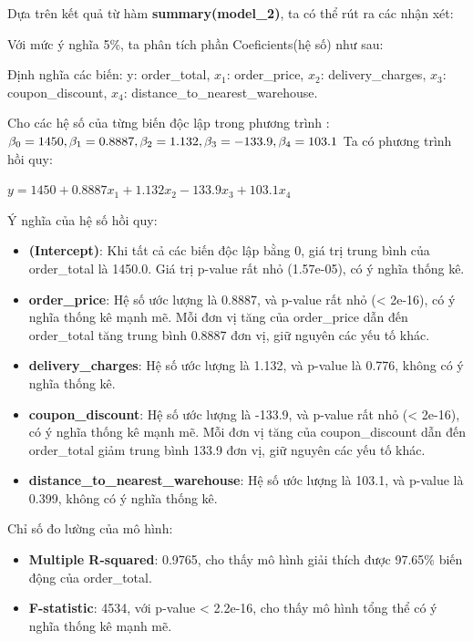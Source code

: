 Dựa trên kết quả từ hàm \textbf{summary(model\_2)}, ta có thể rút ra các nhận xét:

Với mức ý nghĩa 5\%, ta phân tích phần Coeficients(hệ số) như sau:

Định nghĩa các biến:  y: order\_total, $x_1$: order\_price, $x_2$: delivery\_charges, $x_3$: coupon\_discount, $x_4$: distance\_to\_nearest\_warehouse.

Cho các hệ số của từng biến độc lập trong phương trình : $\beta_0= 1450, \beta_1= 0.8887, \\\beta_2= 1.132, \beta_3= -133.9, \beta_4= 103.1$ Ta có phương trình hồi quy: 

 \hspace{25mm}$y= 1450 + 0.8887x_1 + 1.132x_2 - 133.9x_3 + 103.1x_4$

Ý nghĩa của hệ số hồi quy:
\begin{itemize}
\item\textbf{(Intercept)}: Khi tất cả các biến độc lập bằng 0, giá trị trung bình của order\_total là 1450.0. Giá trị p-value rất nhỏ (1.57e-05), có ý nghĩa thống kê.
\item\textbf{order\_price}: Hệ số ước lượng là 0.8887, và p-value rất nhỏ (< 2e-16), có ý nghĩa thống kê mạnh mẽ. Mỗi đơn vị tăng của order\_price dẫn đến order\_total tăng trung bình 0.8887 đơn vị, giữ nguyên các yếu tố khác.\\
\item\textbf{delivery\_charges}: Hệ số ước lượng là 1.132, và p-value là 0.776, không có ý nghĩa thống kê.
\item\textbf{coupon\_discount}: Hệ số ước lượng là -133.9, và p-value rất nhỏ (< 2e-16), có ý nghĩa thống kê mạnh mẽ. Mỗi đơn vị tăng của coupon\_discount dẫn đến order\_total giảm trung bình 133.9 đơn vị, giữ nguyên các yếu tố khác.
\item\textbf{distance\_to\_nearest\_warehouse}: Hệ số ước lượng là 103.1, và p-value là 0.399, không có ý nghĩa thống kê.
\end{itemize}

Chỉ số đo lường của mô hình:

\begin{itemize}
\item\textbf{Multiple R-squared}: 0.9765, cho thấy mô hình giải thích được 97.65\% biến động của order\_total.
\item\textbf{F-statistic}: 4534, với p-value < 2.2e-16, cho thấy mô hình tổng thể có ý nghĩa thống kê mạnh mẽ.
\end{itemize}

